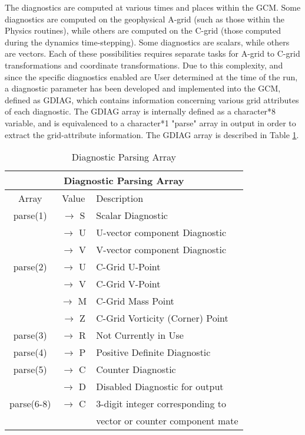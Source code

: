 The diagnostics are computed at various times and places within the GCM.  
Some diagnostics are computed on the geophysical A-grid (such as 
those within the Physics routines), while others are computed on the C-grid 
(those computed during the dynamics time-stepping).  Some diagnostics are 
scalars, while others are vectors.  Each of these possibilities requires
separate tasks for A-grid to C-grid transformations and coordinate transformations.  Due
to this complexity, and since the specific diagnostics enabled are User determined at the
time of the run, 
a diagnostic parameter has been developed and implemented into the GCM, defined as GDIAG,
which contains information concerning various grid attributes of each diagnostic.  The GDIAG
array is internally defined as a character*8 variable, and is equivalenced to 
a character*1 "parse" array in output in order to extract the grid-attribute information.
The GDIAG array is described in Table \ref{tab:diagnostics:gdiag.tabl}.

\begin{table}
\caption{Diagnostic Parsing Array}
\label{tab:diagnostics:gdiag.tabl}
\begin{center}
\begin{tabular}{ |c|c|l| }
\hline
\multicolumn{3}{|c|}{\bf Diagnostic Parsing Array} \\ 
\hline
\hline
Array & Value & Description \\
\hline
  parse(1)   & $\rightarrow$ S &  Scalar Diagnostic                 \\ 
             & $\rightarrow$ U &  U-vector component Diagnostic     \\ 
             & $\rightarrow$ V &  V-vector component Diagnostic     \\ \hline
  parse(2)   & $\rightarrow$ U &  C-Grid U-Point                    \\ 
             & $\rightarrow$ V &  C-Grid V-Point                    \\ 
             & $\rightarrow$ M &  C-Grid Mass Point                 \\ 
             & $\rightarrow$ Z &  C-Grid Vorticity (Corner) Point   \\ \hline
  parse(3)   & $\rightarrow$ R &  Not Currently in Use              \\ \hline
  parse(4)   & $\rightarrow$ P &  Positive Definite Diagnostic      \\ \hline
  parse(5)   & $\rightarrow$ C &  Counter Diagnostic                \\
             & $\rightarrow$ D &  Disabled Diagnostic for output    \\ \hline
  parse(6-8) & $\rightarrow$ C &  3-digit integer corresponding to  \\
             &                 &  vector or counter component mate  \\ \hline
\end{tabular}
\end{center}
\end{table}

